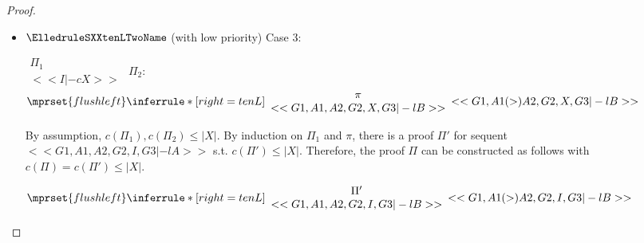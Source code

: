 \begin{proof}
\begin{enumerate}
\begin{itemize}
  \item $\ElledruleSXXtenLTwoName$ (with low priority) Case 3:
      \begin{center}
        \scriptsize
        \begin{math}
          \begin{array}{c}
            \Pi_1 \\
            {<<I |-c X>>}
          \end{array}
        \end{math}
        \qquad\qquad
        $\Pi_2$:
        \begin{math}
          $$\mprset{flushleft}
          \inferrule* [right={\tiny tenL}] {
            {
              \begin{array}{c}
                \pi \\
                {<<G1, A1, A2, G2, X, G3 |-l B>>}
              \end{array}
            }
          }{<<G1, A1 (>) A2, G2, X, G3 |-l B>>}
        \end{math}
      \end{center}
      By assumption, $c(\Pi_1),c(\Pi_2)\leq |X|$. By induction on $\Pi_1$ and $\pi$, there is
      a proof $\Pi'$ for sequent $<<G1, A1, A2, G2, I, G3 |-l A>>$ s.t. $c(\Pi') \leq |X|$.
      Therefore, the proof $\Pi$ can be constructed as follows with
      $c(\Pi) = c(\Pi') \leq |X|$.
      \begin{center}
        \scriptsize
        \begin{math}
          $$\mprset{flushleft}
          \inferrule* [right={\tiny tenL}] {
            {
              \begin{array}{c}
                \Pi' \\
                {<<G1, A1, A2, G2, I, G3 |-l B>>}
              \end{array}
            }
          }{<<G1, A1 (>) A2, G2, I, G3 |-l B>>}
        \end{math}
      \end{center}


\end{itemize}
\end{enumerate}
\end{proof}

